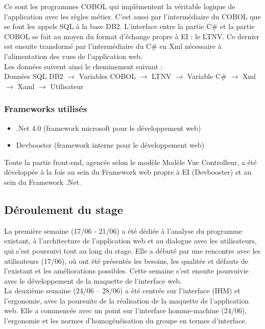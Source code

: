 \documentclass[a4paper,french,12pt]{article}
\begin{document}
			Ce sont les programmes COBOL qui implémentent la véritable logique de l’application avec les règles métier.
			C’est aussi par l’intermédiaire du COBOL que se font les appels SQL à la base DB2.
			L’interface entre la partie C\# et la partie COBOL se fait au moyen du format d’échange propre à EI : le LTNV. 
			Ce dernier est ensuite transformé par l’intermédiaire du C\# en Xml nécessaire à l’alimentation des vues de l’application web.\\ 
			
			Les données suivent ainsi le cheminement suivant : \\

			 Données SQL DB2 $\to$ Variables COBOL $\to$ LTNV $\to$ Variable C\# $\to$ Xml $\to$ Xaml $\to$ Utilisateur 


	
		\subsubsection{Frameworks utilisés}
		
			\begin{itemize}
				\item .Net 4.0 (framework microsoft pour le développement web)
				\item Devbooster (framework interne pour le développement web)
			\end{itemize}
			
			Toute la partie front-end, agencée selon le modèle Modèle Vue Controlleur, a été développée à la fois au sein du Framework  web propre à EI (Devbooster) et au sein du Framework .Net.
		
		
	\subsection{Déroulement du stage}
	
		La première semaine (17/06 - 21/06) a été dédiée à l’analyse du programme existant, à l’architecture de l’application web et au dialogue avec les utilisateurs,
		qui s’est poursuivi tout au long du stage. Elle a débuté par une rencontre avec les utilisateurs (17/06), où ont été présentés les besoins, les qualités et défauts de l’existant et les améliorations possibles. 
		Cette semaine s’est ensuite poursuivie avec le développement de la maquette de l'interface web. \\ 
		
		La deuxième semaine (24/06 – 28/06) a été centrée sur l’interface (IHM) et l’ergonomie, avec la poursuite de la réalisation de la maquette de l’application web.
		Elle a commencée avec un point sur l’interface homme-machine (24/06), l’ergonomie et les normes d’homogénéisation du groupe en termes d’interface.\\ 
		
\end{document}
